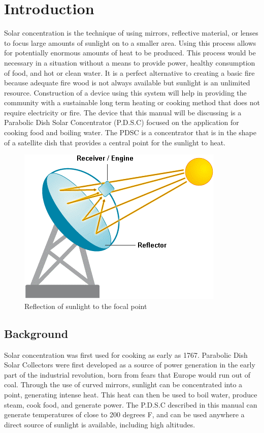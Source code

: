 \documentclass[titlepage]{article}
\begin{document}
    \section{Introduction}
        Solar concentration is the technique of using mirrors, reflective material, or lenses to focus large 
        amounts of sunlight on to a smaller area. Using this process allows for potentially enormous amounts of heat 
        to be produced. This process would be necessary in a situation without a means to provide power, healthy 
        consumption of food, and hot or clean water. It is a perfect alternative to creating a basic fire because 
        adequate fire wood is not always available but sunlight is an unlimited resource. Construction of a device 
        using this system will help in providing the community with a sustainable long term heating or cooking method 
        that does not require electricity or fire. The device that this manual will be discussing is a Parabolic 
        Dish Solar Concentrator (P.D.S.C) focused on the application for cooking food and boiling water. The PDSC is a 
        concentrator that is in the shape of a satellite dish that provides a central point for the sunlight to heat. 
        \begin{figure}
            \includegraphics[scale=.5]{Concentrator-diagram}
            \caption{Reflection of sunlight to the focal point\cite{Reflector}}
        \end{figure}

        \subsection{Background}
            Solar concentration was first used for cooking as early as 1767.  Parabolic Dish Solar Collectors  were first developed 
            as a source of power generation in the early part of the industrial revolution, born from fears that Europe would run 
            out of coal.  Through the use of curved mirrors, sunlight can be concentrated into a point, generating intense heat.  
            This heat can then be used to boil water, produce steam, cook food, and generate power.  The P.D.S.C described in this 
            manual can generate temperatures of close to 200 degrees F, and can be used anywhere a direct source of sunlight is 
            available, including high altitudes\cite{Basking-in-the-Sun}.
        
\end{document}
